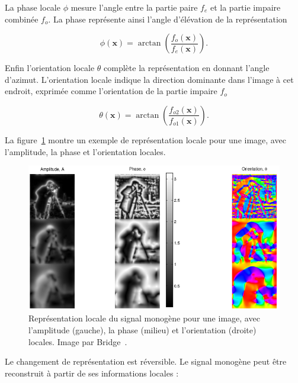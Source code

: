 \noindent La phase locale $\phi$ mesure l'angle entre la partie paire $f_e$ et la partie impaire combinée $f_o$. La phase représente ainsi l'angle d'élévation de la représentation

\begin{equation}
    \phi(\mathbf{x}) = \arctan\left(\frac{f_o(\mathbf{x})}{f_e(\mathbf{x})}\right).
\end{equation}

\noindent Enfin l'orientation locale $\theta$ complète la représentation en donnant l'angle d'azimut. L'orientation locale indique la direction dominante dans l'image à cet endroit, exprimée comme l'orientation de la partie impaire $f_o$

\begin{equation}
    \theta(\mathbf{x}) = \arctan\left(\frac{f_{o2}(\mathbf{x})}{f_{o1}(\mathbf{x})}\right).
\end{equation}

\noindent La figure~\ref{fig:monogenic-local-representation} montre un exemple de représentation locale pour une image, avec l'amplitude, la phase et l'orientation locales.

\bigskip

\begin{figure}
    \centering
    \includegraphics[width=\textwidth]{contenu/resources/images/local_information_monogenic}
    \caption[Représentation locale du signal monogène]{Représentation locale du signal monogène pour une image, avec l'amplitude (gauche), la phase (milieu) et l'orientation (droite) locales. Image par Bridge~\cite{bridge_introduction_2018}.}
    \label{fig:monogenic-local-representation}
\end{figure}

Le changement de représentation est réversible. Le signal monogène peut être reconstruit à partir de ses informations locales :

